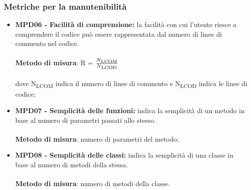 \subsubsection{Metriche per la manutenibilit\`a}
\begin{itemize}
    \item \textbf{MPD06 - Facilità di comprensione:} la facilità con cui l'utente riesce a comprendere il codice può essere rappresentata dal numero di linee di commento nel codice.\\
    \\\textbf{Metodo di misura}: R = $\frac{N\textsubscript{LCOM}}{N\textsubscript{LCOD}}$ \\
    \\dove N\textsubscript{LCOM} indica il numero di linee di commento e N\textsubscript{LCOD} indica le linee di codice;
    \item \textbf{MPD07 - Semplicità delle funzioni:} indica la semplicità di un metodo in base al numero di parametri passati allo stesso.\\
    \\\textbf{Metodo di misura}: numero di parametri del metodo;
    \item \textbf{MPD08 - Semplicità delle classi:}  indica la semplicità di una classe in base al numero di metodi della stessa.\\
    \\\textbf{Metodo di misura}: numero di metodi della classe.
\end{itemize}
